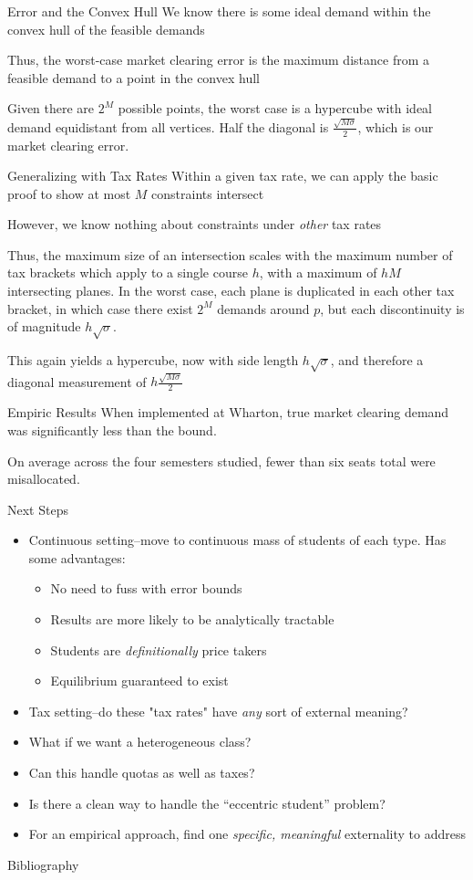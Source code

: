 \documentclass{beamer}
\begin{document}
\begin{frame}{Error and the Convex Hull}
We know there is some ideal demand within the convex hull of the feasible demands

Thus, the worst-case market clearing error is the maximum distance from a feasible demand to a point in the convex hull

Given there are $2^M$ possible points, the worst case is a hypercube with ideal demand equidistant from all vertices. Half the diagonal is $\frac{\sqrt{M\sigma}}{2}$, which is our market clearing error.
\end{frame}

\begin{frame}{Generalizing with Tax Rates}
Within a given tax rate, we can apply the basic proof to show at most $M$ constraints intersect
\pause 

However, we know nothing about constraints under \emph{other} tax rates
\pause 

Thus, the maximum size of an intersection scales with the maximum number of tax brackets which apply to a single course $h$, with a maximum of $hM$ intersecting planes. In the worst case, each plane is duplicated in each other tax bracket, in which case there exist $2^M$ demands around $p$, but each discontinuity is of magnitude $h\sqrt{\sigma}$.

This again yields a hypercube, now with side length $h\sqrt{\sigma}$, and therefore a diagonal measurement of $h\frac{\sqrt{M\sigma}}{2}$
\end{frame}
\begin{frame}{Empiric Results}
When implemented at Wharton, true market clearing demand was significantly less than the bound.

On average across the four semesters studied, fewer than six seats total were misallocated.
\end{frame}
\begin{frame}{Next Steps}
	\begin{itemize}
		\item Continuous setting--move to continuous mass of students of each type. Has some advantages:
		\begin{itemize}
			\item No need to fuss with error bounds
			\item Results are more likely to be analytically tractable
			\item Students are \emph{definitionally} price takers
			\item Equilibrium guaranteed to exist
		\end{itemize}
		\item Tax setting--do these "tax rates" have \emph{any} sort of external meaning?
		\item What if we want a heterogeneous class?
		\item Can this handle quotas as well as taxes?
		\item Is there a clean way to handle the ``eccentric student'' problem?
		\item For an empirical approach, find one \emph{specific, meaningful} externality to address
	\end{itemize}
\end{frame}
\begin{frame}[allowframebreaks]{Bibliography}
\printbibliography
\end{frame}
\end{document}
